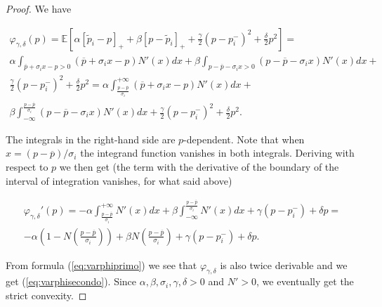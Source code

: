 \documentclass[10pt,a4paper]{amsart}
\begin{document}
\begin{proof}
We have

\[
\begin{array}{ll}
\displaystyle
\varphi_{\gamma,\delta}(p)=\mathbb{E}\left[\alpha[\tilde p_i-p]_++\beta[p-\tilde p_i]_++\frac{\gamma}{2}(p-p_i^-)^2+\frac{\delta}{2}p^2\right]=\\
\displaystyle
\alpha\int_{\overline p+\sigma_ix-p>0}(\overline p+\sigma_ix-p)N'(x)dx+\beta\int_{p-\overline p-\sigma_ix>0}(p-\overline p-\sigma_ix)N'(x)dx+\\
\displaystyle
\frac{\gamma}{2}(p-p_i^-)^2+\frac{\delta}{2}p^2=\alpha\int_{\frac{p-\overline p}{\sigma_i}}^{+\infty}(\overline p+\sigma_ix-p)N'(x)dx+\\
\displaystyle
\beta\int_{-\infty}^{\frac{p-\overline p}{\sigma_i}}(p-\overline p-\sigma_ix)N'(x)dx+\frac{\gamma}{2}(p-p_i^-)^2+\frac{\delta}{2}p^2.
\end{array}
\]

\noindent
The integrals in the right-hand side are $p$-dependent. Note that when $x=(p-\overline p)/\sigma_i$ the integrand function vanishes in both integrals. Deriving with respect to $p$ we then get (the term with the derivative of the boundary of the interval of integration vanishes, for what said above)

\begin{equation}
\begin{array}{ll}
\displaystyle
\varphi_{\gamma,\delta}'(p)=-\alpha\int_{\frac{p-\overline p}{\sigma_i}}^{+\infty}N'(x)dx+\beta\int_{-\infty}^{\frac{p-\overline p}{\sigma_i}}N'(x)dx+\gamma(p-p_i^-)+\delta p=\\
\displaystyle
-\alpha\left(1-N\left(\frac{p-\overline p}{\sigma_i}\right)\right)+\beta N\left(\frac{p-\overline p}{\sigma_i}\right)+\gamma(p-p_i^-)+\delta p.
\end{array}
\end{equation}

\noindent
From formula (\ref{eq:varphiprimo}) we see that $\varphi_{\gamma,\delta}$ is also twice derivable and we get (\ref{eq:varphisecondo}). Since $\alpha,\beta,\sigma_i,\gamma,\delta>0$ and $N'>0$, we eventually get the strict convexity.

\end{proof}
\end{document}
